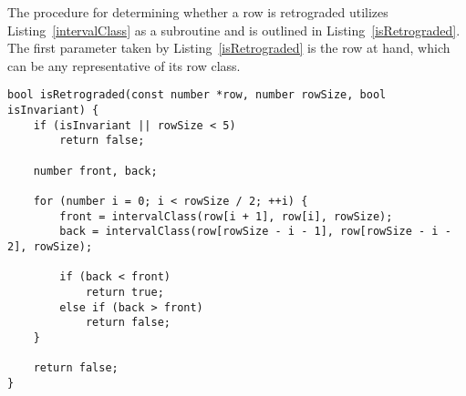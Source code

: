 The procedure for determining whether a row is retrograded utilizes Listing~\ref{intervalClass} as a subroutine and is outlined in Listing~\ref{isRetrograded}. The first parameter taken by Listing~\ref{isRetrograded} is the row at hand, which can be any representative of its row class.

\begin{lstlisting}[caption={Determining whether a representative of a row class is retrograded.},label={isRetrograded}]
bool isRetrograded(const number *row, number rowSize, bool isInvariant) {
    if (isInvariant || rowSize < 5)
        return false;

    number front, back;

    for (number i = 0; i < rowSize / 2; ++i) {
        front = intervalClass(row[i + 1], row[i], rowSize);
        back = intervalClass(row[rowSize - i - 1], row[rowSize - i - 2], rowSize);

        if (back < front)
            return true;
        else if (back > front)
            return false;
    }

    return false;
}
\end{lstlisting}

